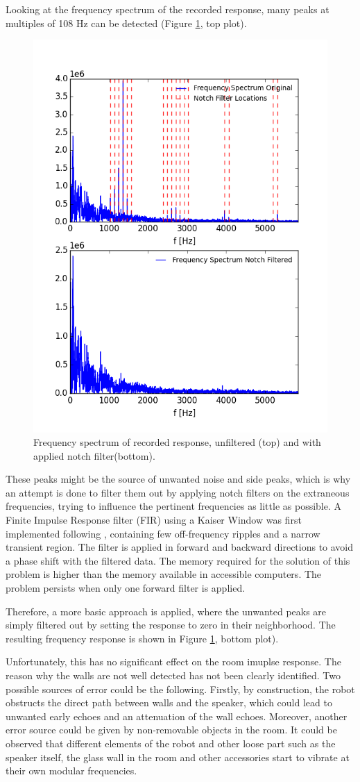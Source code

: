 Looking at the frequency spectrum of the recorded response, many peaks at multiples of 108 Hz can be detected (Figure \ref{fig:RIR_filtered}, top plot). 
\begin{figure}[H]
    \centering
    \includegraphics[width=.5\linewidth]{files/notchY.png}
    \caption{Frequency spectrum of recorded response, unfiltered (top) and with applied notch filter(bottom).}
    \label{fig:RIR_filtered}
\end{figure}
These peaks might be the source of unwanted noise and side peaks, which is why an attempt is done to filter them out by applying notch filters on the extraneous frequencies, trying to influence the pertinent frequencies as little as possible. 
A Finite Impulse Response filter (FIR) using a Kaiser Window was first implemented following \cite{notch}, containing few off-frequency ripples and a narrow transient region. 
The filter is applied in forward and backward directions to avoid a phase shift with the filtered data. 
The memory required for the solution of this problem is higher than the memory available in accessible computers. The problem persists when only one forward filter is applied. 

Therefore, a more basic approach is applied, where the unwanted peaks are simply filtered out by setting the response to zero in their neighborhood. The resulting frequency response is shown in Figure \ref{fig:RIR_filtered}, bottom plot). 

Unfortunately, this has no significant effect on the room imuplse response. The reason why the walls are not well detected has not been clearly identified. 
Two possible sources of error could be the following.
Firstly, by construction, the robot obstructs the direct path between walls and the speaker, which could lead to unwanted early echoes and an attenuation of the wall echoes.
Moreover, another error source could be given by non-removable objects in the room. 
It could be observed that different elements of the robot and other loose part such as the speaker itself, the glass wall in the room and other accessories start to vibrate at their own modular frequencies. 

